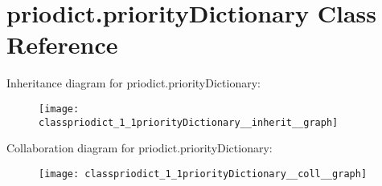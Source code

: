 \hypertarget{classpriodict_1_1priorityDictionary}{\section{priodict.\-priority\-Dictionary Class Reference}
\label{classpriodict_1_1priorityDictionary}
}


Inheritance diagram for priodict.\-priority\-Dictionary\-:\nopagebreak
\begin{figure}[H]
\begin{center}
\leavevmode
\texttt{[image: classpriodict\_1\_1priorityDictionary\_\_inherit\_\_graph]}
\end{center}
\end{figure}


Collaboration diagram for priodict.\-priority\-Dictionary\-:\nopagebreak
\begin{figure}[H]
\begin{center}
\leavevmode
\texttt{[image: classpriodict\_1\_1priorityDictionary\_\_coll\_\_graph]}
\end{center}
\end{figure}
